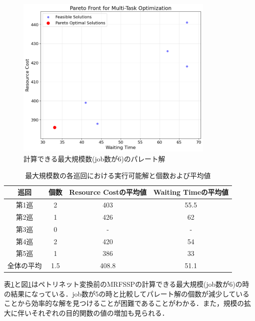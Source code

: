 \begin{figure}[H]
    \centering
    \includegraphics[width=0.8\linewidth, height=8cm]{./images/parato_job6.png}
    \caption{計算できる最大規模数(job数が6)のパレート解}
    \label{fig:fig4}
\end{figure}
\clearpage

\begin{table}[ht]
    \centering
    \vspace{-0.3cm}
    \caption{最大規模数の各巡回における実行可能解と個数および平均値}
    \begin{tabular}{|c|c|c|c|}
        \hline
         巡回 & 個数 & Resource Costの平均値 & Waiting Timeの平均値 \\
        \hline
        第1巡 & 2 & 403 & 55.5 \\
        \hline
        第2巡 & 1 & 426 & 62 \\
        \hline
        第3巡 & 0 & - & - \\
        \hline
        第4巡 & 2 & 420 & 54 \\
        \hline
        第5巡 & 1 & 386 & 33 \\
        \hline
        全体の平均 & 1.5 & 408.8 & 51.1 \\
        \hline
    \end{tabular}
    \label{tab:before_feasible_max}
\end{table}

表\ref{tab:before_feasible_max}と図\ref{fig:fig4}はペトリネット変換前のMRFSSPの計算できる最大規模(job数が6)の時の結果になっている．job数が5の時と比較してパレート解の個数が減少していることから効率的な解を見つけることが困難であることがわかる．また，規模の拡大に伴いそれぞれの目的関数の値の増加も見られる．

